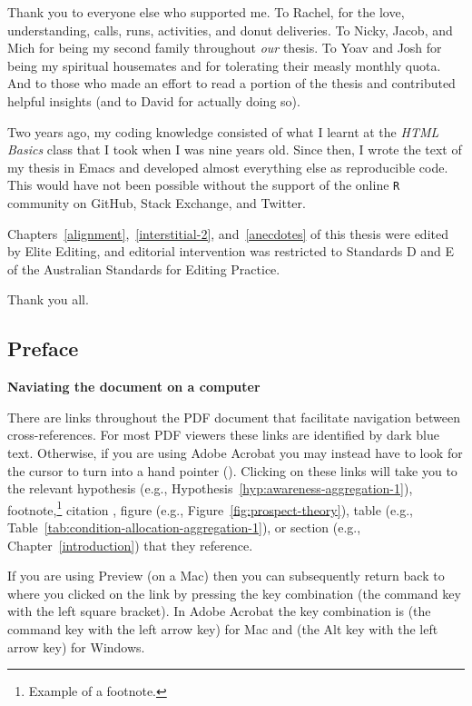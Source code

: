 \documentclass[a4paper, nobind]{templates/ociamthesis}
\newenvironment{preface}%
{   \begin{alwayssingle}\chapter*{Preface}
    \thispagestyle{empty}
    \pagestyle{empty}
    \setlength{\baselineskip}{\frontmatterbaselineskip}
  }
  {\end{alwayssingle}}
\theoremstyle{definition}
\theoremstyle{definition}
\theoremstyle{definition}
\theoremstyle{definition}
\theoremstyle{remark}
\begin{document}
\begin{romanpages}
\begin{acknowledgements}
  Thank you to everyone else who supported me. To Rachel, for the love,
  understanding, calls, runs, activities, and donut deliveries. To Nicky, Jacob,
  and Mich for being my second family throughout \emph{our} thesis. To Yoav and Josh
  for being my spiritual housemates and for tolerating their measly monthly quota.
  And to those who made an effort to read a portion of the thesis and contributed
  helpful insights (and to David for actually doing so).

  Two years ago, my coding knowledge consisted of what I learnt at the \emph{HTML
  Basics} class that I took when I was nine years old. Since then, I wrote the
  text of my thesis in Emacs and developed almost everything else as reproducible
  code. This would have not been possible without the support of the online \texttt{R}
  community on GitHub, Stack Exchange, and Twitter.

  Chapters~\ref{alignment},~\ref{interstitial-2}, and~\ref{anecdotes} of this
  thesis were edited by Elite Editing, and editorial intervention was restricted
  to Standards D and E of the Australian Standards for Editing Practice.

  Thank you all.
\end{acknowledgements}

\begin{preface}
 	\noindent \textbf{Naviating the document on a computer}

  There are links throughout the PDF document that facilitate navigation between
  cross-references. For most PDF viewers these links are identified by
  \textcolor{mylinkcolor}{dark blue} text. Otherwise, if you are using Adobe
  Acrobat you may instead have to look for the cursor to turn into a hand pointer
  (\faHandPointer[regular]). Clicking on these links will take you to the relevant
  hypothesis (e.g., Hypothesis~\ref{hyp:awareness-aggregation-1}),
  footnote,\footnote{Example of a footnote.} citation \autocite[e.g.,][]{kahneman1979}, figure (e.g.,
  Figure~\ref{fig:prospect-theory}), table (e.g.,
  Table~\ref{tab:condition-allocation-aggregation-1}), or section (e.g.,
  Chapter~\ref{introduction}) that they reference.

  If you are using Preview (on a Mac) then you can subsequently return back to
  where you clicked on the link by pressing the key combination \keys{\cmd + [}
  (the command key with the left square bracket). In Adobe Acrobat the key
  combination is \keys{\cmd + \arrowkeyleft} (the command key with the left arrow
  key) for Mac and \keys{\Altwin + \arrowkeyleft} (the Alt key with the left arrow
  key) for Windows.


\end{preface}
\end{romanpages}
\end{document}
